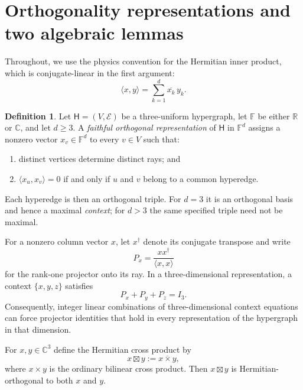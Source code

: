 \documentclass[twocolumn,aps,pra,floatfix,amsmath,amssymb,longbibliography]{revtex4-2}
\theoremstyle{definition}
\newtheorem{definition}[theorem]{Definition}
\theoremstyle{remark}
\newcommand{\C}{\mathbb C}
\newcommand{\R}{\mathbb R}
\begin{document}
\section{Orthogonality representations and two algebraic lemmas}

Throughout, we use the physics convention for the Hermitian inner product,
which is conjugate-linear in the first argument:
\begin{equation}
 \langle x,y\rangle=\sum_{k=1}^{d}\overline{x_k}\,y_k.
 \label{eq:inner-product}
\end{equation}

\begin{definition}
Let $\mathsf H=(V,\mathcal E)$ be a three-uniform hypergraph, let
$\mathbb F$ be either $\R$ or $\C$, and let $d\ge3$.  A \emph{faithful
orthogonal representation} of $\mathsf H$ in $\mathbb F^d$ assigns a nonzero
vector $x_v\in\mathbb F^d$ to every $v\in V$ such that:
\begin{enumerate}
\item distinct vertices determine distinct rays; and
\item $\langle x_u,x_v\rangle=0$ if and only if $u$ and $v$ belong to a
common hyperedge.
\end{enumerate}
Each hyperedge is then an orthogonal triple.  For $d=3$ it is an orthogonal
basis and hence a maximal \emph{context}; for $d>3$ the same specified triple
need not be maximal.
\end{definition}

For a nonzero column vector $x$, let $x^\dagger$ denote its conjugate
transpose and write
\begin{equation}
 P_x=\frac{xx^\dagger}{\langle x,x\rangle}
 \label{eq:projector}
\end{equation}
for the rank-one projector onto its ray.  In a three-dimensional
representation, a context $\{x,y,z\}$ satisfies
\begin{equation}
 P_x+P_y+P_z=I_3.
 \label{eq:context-sum}
\end{equation}
Consequently, integer linear combinations of three-dimensional context
equations can force projector identities that hold in every representation
of the hypergraph in that dimension.

For $x,y\in\C^3$ define the Hermitian cross product by
\begin{equation}
 x\boxtimes y:=\overline{x\times y},
 \label{eq:hcross}
\end{equation}
where $x\times y$ is the ordinary bilinear cross product.  Then
$x\boxtimes y$ is Hermitian-orthogonal to both $x$ and $y$.
\end{document}
